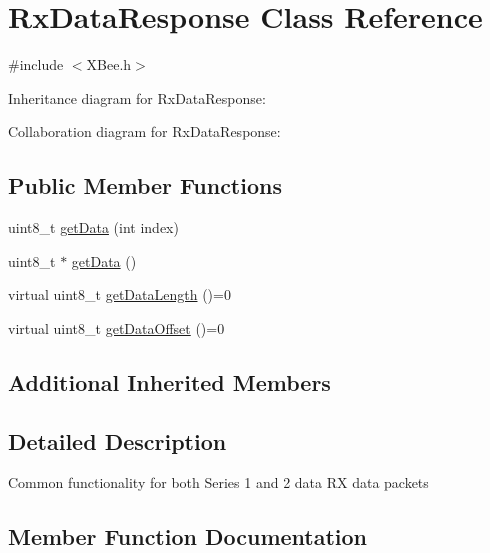 \hypertarget{class_rx_data_response}{}\section{Rx\+Data\+Response Class Reference}
\label{class_rx_data_response}


{\ttfamily \#include $<$X\+Bee.\+h$>$}



Inheritance diagram for Rx\+Data\+Response\+:


Collaboration diagram for Rx\+Data\+Response\+:
\subsection*{Public Member Functions}
\begin{DoxyCompactItemize}
\item 
uint8\+\_\+t \hyperlink{class_rx_data_response_a28db0306283f4191e4fc8a5b049486f5}{get\+Data} (int index)
\item 
uint8\+\_\+t $\ast$ \hyperlink{class_rx_data_response_ae0f858fe479a07c7122a8d414c60517e}{get\+Data} ()
\item 
virtual uint8\+\_\+t \hyperlink{class_rx_data_response_a5845e6a0719fd0bf52675e47053a704e}{get\+Data\+Length} ()=0
\item 
virtual uint8\+\_\+t \hyperlink{class_rx_data_response_a9e4b6bf4f1bfd9ccec45d190a204f61a}{get\+Data\+Offset} ()=0
\end{DoxyCompactItemize}
\subsection*{Additional Inherited Members}


\subsection{Detailed Description}
Common functionality for both Series 1 and 2 data RX data packets 

\subsection{Member Function Documentation}
\hypertarget{class_rx_data_response_a28db0306283f4191e4fc8a5b049486f5}{}\label{class_rx_data_response_a28db0306283f4191e4fc8a5b049486f5} 
